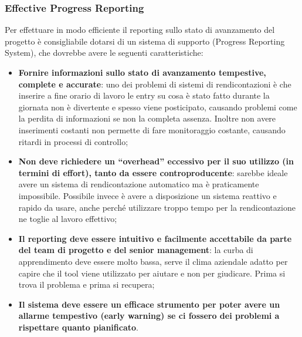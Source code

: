 \subsubsection{Effective Progress Reporting}
Per effettuare in modo efficiente il reporting sullo stato di avanzamento del progetto è consigliabile dotarsi di un sistema di supporto (Progress Reporting System), che dovrebbe avere le seguenti caratteristiche:
\begin{itemize}
	\item \textbf{Fornire informazioni sullo stato di avanzamento tempestive, complete e accurate}: uno dei problemi di sistemi di rendicontazioni è che inserire a fine orario di lavoro le entry su cosa è stato fatto durante la giornata non è divertente e spesso viene posticipato, causando problemi come la perdita di informazioni se non la completa assenza. Inoltre non avere inserimenti costanti non permette di fare monitoraggio costante, causando ritardi in processi di controllo;
	\item \textbf{Non deve richiedere un “overhead” eccessivo per il suo utilizzo (in termini di effort), tanto da essere controproducente}: sarebbe ideale avere un sistema di rendicontazione automatico ma è praticamente impossibile. Possibile invece è avere a disposizione un sistema reattivo e rapido da usare, anche perché utilizzare troppo tempo per la rendicontazione ne toglie al lavoro effettivo;
	\item \textbf{Il reporting deve essere intuitivo e facilmente accettabile da parte del team di progetto e del senior management}: la curba di apprendimento deve essere molto bassa, serve il clima aziendale adatto per capire che il tool viene utilizzato per aiutare e non per giudicare. Prima si trova il problema e prima si recupera;
	\item \textbf{Il sistema deve essere un efficace strumento per poter avere un allarme tempestivo (early warning) se ci fossero dei problemi a rispettare quanto pianificato}.
\end{itemize}
